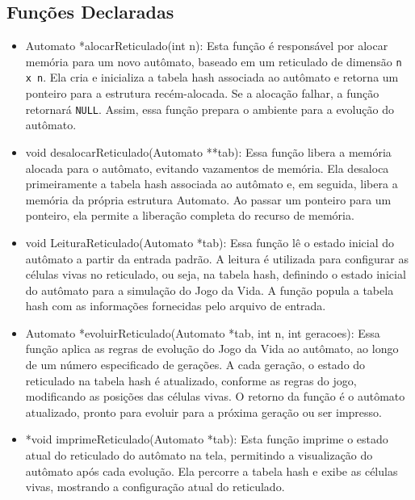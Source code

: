 \documentclass{article}
\begin{document}
 \subsection{Funções Declaradas}

 \begin{itemize}

 \item Automato *alocarReticulado(int n): Esta função é responsável por alocar memória para um novo autômato, baseado em um reticulado de dimensão \verb|n x n|. Ela cria e inicializa a tabela hash associada ao autômato e retorna um ponteiro para a estrutura recém-alocada. Se a alocação falhar, a função retornará \verb|NULL|. Assim, essa função prepara o ambiente para a evolução do autômato.

 \item  void desalocarReticulado(Automato **tab): Essa função libera a memória alocada para o autômato, evitando vazamentos de memória. Ela desaloca primeiramente a tabela hash associada ao autômato e, em seguida, libera a memória da própria estrutura Automato. Ao passar um ponteiro para um ponteiro, ela permite a liberação completa do recurso de memória. 

\item void LeituraReticulado(Automato *tab): Essa função lê o estado inicial do autômato a partir da entrada padrão. A leitura é utilizada para configurar as células vivas no reticulado, ou seja, na tabela hash, definindo o estado inicial do autômato para a simulação do Jogo da Vida. A função popula a tabela hash com as informações fornecidas pelo arquivo de entrada.

\item  Automato *evoluirReticulado(Automato *tab, int n, int geracoes): Essa função aplica as regras de evolução do Jogo da Vida ao autômato, ao longo de um número especificado de gerações. A cada geração, o estado do reticulado na tabela hash é atualizado, conforme as regras do jogo, modificando as posições das células vivas. O retorno da função é o autômato atualizado, pronto para evoluir para a próxima geração ou ser impresso.

\item *void imprimeReticulado(Automato *tab): Esta função imprime o estado atual do reticulado do autômato na tela, permitindo a visualização do autômato após cada evolução. Ela percorre a tabela hash e exibe as células vivas, mostrando a configuração atual do reticulado.


 \end{itemize}
\end{document}
